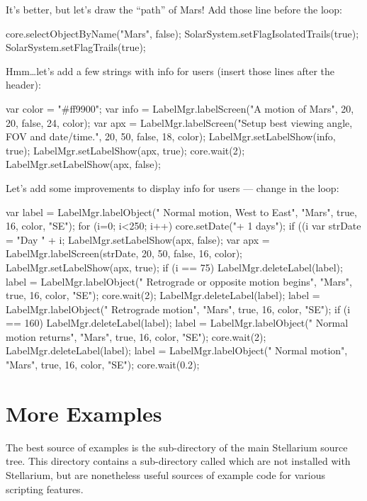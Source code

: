 It's better, but let's draw the ``path'' of Mars! Add 
those line before the loop:
\begin{script}
core.selectObjectByName("Mars", false);
SolarSystem.setFlagIsolatedTrails(true);
SolarSystem.setFlagTrails(true);
\end{script}

Hmm\ldots let's add a few strings with info for users (insert 
those lines after the header):
\begin{script}
var color = "#ff9900";
var info = LabelMgr.labelScreen("A motion of Mars", 20, 20, 
           false, 24, color);
var apx = LabelMgr.labelScreen("Setup best viewing angle, FOV 
          and date/time.", 20, 50, false, 18, color);
LabelMgr.setLabelShow(info, true);
LabelMgr.setLabelShow(apx, true);
core.wait(2);
LabelMgr.setLabelShow(apx, false);
\end{script}

Let's add some improvements to display info for users --- 
change in the loop:
\begin{script}
var label = LabelMgr.labelObject("  Normal motion, West to 
            East", "Mars", true, 16, color, "SE");
for (i=0; i<250; i++)
{
	core.setDate("+ 1 days");
	if ((i %
	{
		var strDate = "Day " + i;
		LabelMgr.setLabelShow(apx, false);
		var apx = LabelMgr.labelScreen(strDate, 20, 
				  50, false, 16, color);
		LabelMgr.setLabelShow(apx, true);
	}
	if (i == 75)
	{
		LabelMgr.deleteLabel(label);
		label = LabelMgr.labelObject("  Retrograde or 
		        opposite motion begins", "Mars", 
		        true, 16, color, "SE");
		core.wait(2);
		LabelMgr.deleteLabel(label);
		label = LabelMgr.labelObject("  Retrograde 
		        motion", "Mars", true, 16, color, 
		        "SE");
	}
	if (i == 160)
	{
		LabelMgr.deleteLabel(label);
		label = LabelMgr.labelObject("  Normal motion 
		        returns", "Mars", true, 16, color, 
		        "SE");
		core.wait(2);
		LabelMgr.deleteLabel(label);
		label = LabelMgr.labelObject("  Normal motion", 
		        "Mars", true, 16, color, "SE");
	}
	core.wait(0.2);
}
\end{script}

\section{More Examples}
\label{sec:scripting:examples}
The best source of examples is the  sub-directory of the
main Stellarium source tree. This directory contains a sub-directory
called  which are not installed with Stellarium, but are
nonetheless useful sources of example code for various scripting
features.




